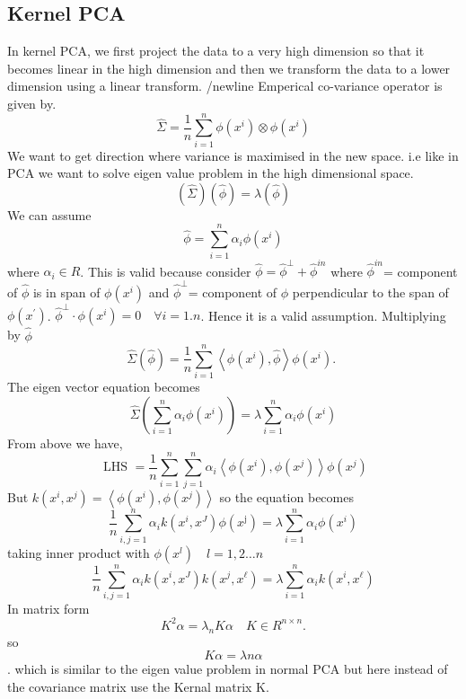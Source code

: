 \documentclass[../main.tex]{subfiles}
\begin{document}
    \subsection{Kernel PCA}
In kernel PCA, we first project the data to a very high dimension so that it becomes linear in the high dimension and then we transform the data to a lower dimension using a linear transform. 
/newline
Emperical co-variance operator is given by.
$$
\hat{\Sigma}=\frac{1}{n} \sum_{i=1}^{n} \phi\left(x^{i}\right) \otimes \phi\left(x^{i}\right)
$$
We want to get direction where variance is maximised in the new space. i.e like in PCA we want to solve eigen value problem in the high dimensional space.
$$
(\hat{\Sigma})(\hat{\phi})=\lambda(\hat{\phi})
$$
We can assume $$\hat{\phi}=\sum_{i=1}^{n} \alpha_{i} \phi\left(x^{i}\right)$$ where $\alpha_{i} \in R$. 
This is valid because consider $\hat{\phi}=\hat{\phi}^{\perp}+\hat{\phi}^{in}$ where
$\hat{\phi}^{in}$= component of $\hat{\phi}$ is in span of $\phi\left(x^{i}\right)$ and
$\hat{\phi}^{\perp}$= component of $\hat{\phi}$ perpendicular to the span of $\phi\left(x^{\prime}\right)$. $\hat{\phi}^{\perp} \cdot \phi\left(x^{i}\right)=0 \quad \forall i=1 . n$. Hence it is a valid assumption.
Multiplying by $\hat{\phi}$
$$
\hat{\Sigma}(\hat{\phi})=\frac{1}{n} \sum_{i=1}^{n}\left\langle\phi\left(x^{i}\right), \hat{\phi}\right\rangle \phi\left(x^{i}\right) \text {. }
$$
The eigen vector equation becomes
$$
\hat{\Sigma}\left(\sum_{i=1}^{n} \alpha_{i} \phi\left(x^{i}\right)\right)=\lambda \sum_{i=1}^{n} \alpha_{i} \phi\left(x^{i}\right)
$$
From above we have,
$$
\text { LHS }=\frac{1}{n} \sum_{i=1}^{n} \sum_{j=1}^{n} \alpha_{i}\left\langle\phi\left(x^{i}\right), \phi\left(x^{j}\right)\right\rangle \phi\left(x^{j}\right)
$$
But $k\left(x^{i}, x^{j}\right)=\left\langle\phi\left(x^{i}\right), \phi\left(x^{j}\right)\right\rangle$
so the equation becomes
$$
\frac{1}{n} \sum_{i, j=1}^{n} \alpha_{i} k\left(x^{i}, x^{J}\right) \phi\left(x^{\mathrm{j}}\right)=\lambda \sum_{i=1}^{n} \alpha_{i} \phi\left(x^{i}\right)
$$
taking inner product with $\phi\left(x^{l}\right) \quad l=1,2 \ldots n$
$$
\frac{1}{n} \sum_{i, j=1}^{n} \alpha_{i} k\left(x^{i}, x^{J}\right) k\left(x^{j}, x^{\ell}\right)=\lambda \sum_{i=1}^{n} \alpha_{i} k\left(x^{i}, x^{\ell}\right)
$$
In matrix form
$$
K^{2} \alpha=\lambda_{n} K \alpha \quad K \in R^{n \times n} .
$$
so $$K \alpha=\lambda n \alpha$$.
which is similar to the eigen value problem in normal PCA but here instead of the covariance matrix use the Kernal matrix K.
\end{document}
